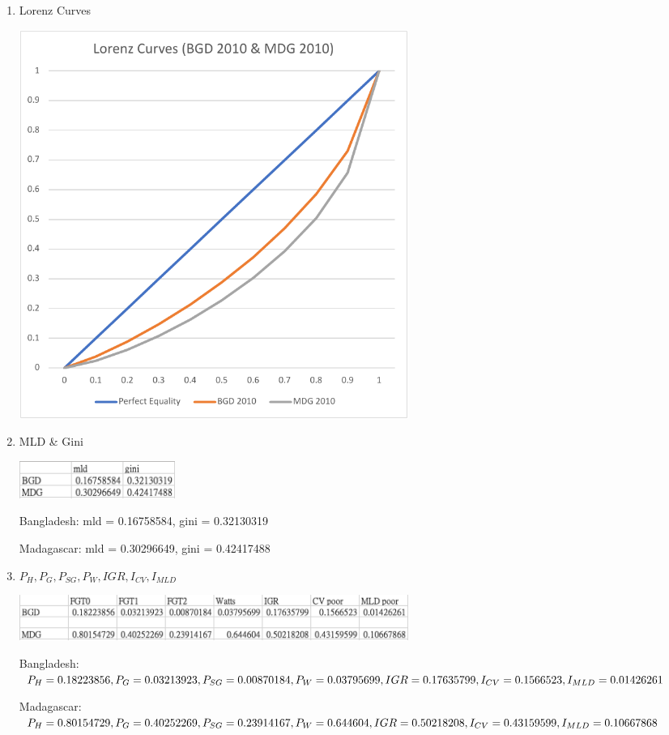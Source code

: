 \documentclass{article}[13pt]
\begin{document}
\begin{enumerate}
    \item{Lorenz Curves}
    
    \includegraphics[width=5in]{bgd_mdg_curve.pdf}

    \item{MLD \& Gini}
    
    \includegraphics[width=2in]{bdg_mdg_2.png}

    Bangladesh: mld = 0.16758584, gini = 0.32130319

    Madagascar: mld = 0.30296649, gini = 0.42417488

    \item{$P_H, P_G, P_{SG}, P_W, IGR, I_{CV}, I_{MLD}$}
    
    \includegraphics[width=5in]{bdg_mdg_1.png}

    Bangladesh: \newline$P_H = 0.18223856, P_G = 0.03213923, P_{SG} = 0.00870184, P_W = 0.03795699, \newline IGR = 0.17635799, I_{CV} = 0.1566523, I_{MLD} = 0.01426261$

    Madagascar: \newline$P_H = 0.80154729, P_G = 0.40252269, P_{SG} = 0.23914167, P_W = 0.644604, \newline IGR = 0.50218208, I_{CV} = 0.43159599, I_{MLD} = 0.10667868$
    
\end{enumerate}
\end{document}

